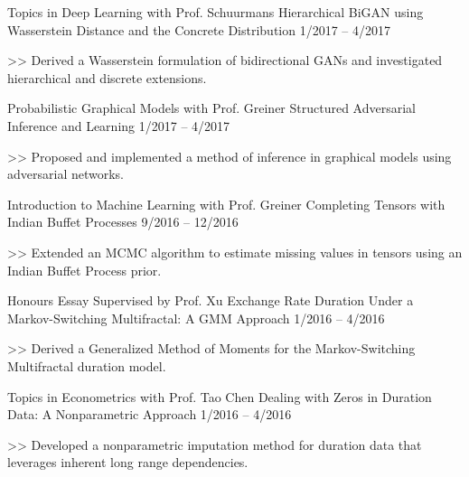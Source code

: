 \begin{cventries}
  \cventry
    {Topics in Deep Learning with Prof. Schuurmans}
    {Hierarchical BiGAN using Wasserstein Distance and
the Concrete Distribution}
    {1/2017 -- 4/2017}
    {
      \begin{cvitems}
        \item[>>] Derived a Wasserstein formulation of bidirectional GANs and investigated hierarchical and discrete extensions.
      \end{cvitems}
    }
  \cventry
    {Probabilistic Graphical Models with Prof. Greiner}
    {Structured Adversarial Inference and Learning}
    {1/2017 -- 4/2017}
    {
      \begin{cvitems}
        \item[>>] Proposed and implemented a method of inference in graphical models using adversarial networks.
      \end{cvitems}
    }
  \cventry
    {Introduction to Machine Learning with Prof. Greiner}
    {Completing Tensors with Indian Buffet Processes}
    {9/2016 -- 12/2016}
    {
      \begin{cvitems}
		\item[>>] Extended an MCMC algorithm to estimate missing values in tensors using an Indian Buffet Process prior.
      \end{cvitems}
    }
  \cventry
    {Honours Essay Supervised by Prof. Xu}
    {Exchange Rate Duration Under a Markov-Switching Multifractal: A GMM Approach}
    {1/2016 -- 4/2016}
    {
      \begin{cvitems}
      	\item[>>] Derived a Generalized Method of Moments for the Markov-Switching Multifractal duration model.
      \end{cvitems}
    }
    \cventry
    {Topics in Econometrics with Prof. Tao Chen}
    {Dealing with Zeros in Duration Data: A Nonparametric Approach}
    {1/2016 -- 4/2016}
    {
      \begin{cvitems}
        \item[>>] Developed a nonparametric imputation method for duration data that leverages inherent long range dependencies.
      \end{cvitems}
    }
\end{cventries}

